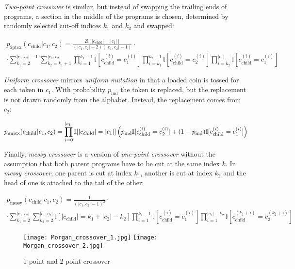 \emph{Two-point crossover} is similar, but instead of swapping the trailing ends of programs, a section in the middle of the programs is chosen, determined by randomly selected cut-off indices $k_1$ and $k_2$ and swapped:

\begin{multline}
    p_\text{2ptcx}(c_\text{child}|c_1,c_2) =
        \frac{2 \mathbb{I}[|c_\text{child}|=|c_1|]}{(|c_1,c_2|-2)(|c_1,c_2|-1)} 
        \cdot \\ \cdot
        \sum\limits_{k_1=2}^{|c_1,c_2|-1}
        \sum\limits_{k_2=k_1+1}^{|c_1,c_2|} 
        \prod\limits_{i=1}^{k_1-1} \mathbb{I}[c_\text{child}^{(i)} = c_1^{(i)}] \prod\limits_{i=k_1}^{k_2-1} \mathbb{I}[c_\text{child}^{(i)} = c_2^{(i)}]
        \prod\limits_{i=k_2}^{|c_1|} \mathbb{I}[c_\text{child}^{(i)} = c_1^{(i)}]
\end{multline}

\emph{Uniform crossover} mirrors \emph{uniform mutation} in that a loaded coin is tossed for each token in $c_1$. With probability $p_\text{ind}$ the token is replaced, but the replacement is not drawn randomly from the alphabet. Instead, the replacement comes from $c_2$:

\begin{equation}
    p_\text{unicx}(c_\text{child}|c_1,c_2) = \prod\limits_{i=0}^{|c_1|} \mathbb{I}[|c_\text{child}|=|c_1|] \\ \left(p_\text{ind} \mathbb{I}[c_\text{child}^{(i)} = c_2^{(i)}] + (1 - p_\text{ind}) \mathbb{I}[c_\text{child}^{(i)} = c_1^{(i)}] \right)
\end{equation}

Finally, \emph{messy crossover} is a version of \emph{one-point crossover} without the assumption that both parent programs have to be cut at the same index $k$.
In \emph{messy crossover}, one parent is cut at index $k_1$, another is cut at index $k_2$ and the head of one is attached to the tail of the other:

\begin{multline}
    p_\text{messy}(c_\text{child}|c_1,c_2) = \frac{1}{(|c_1,c_2|-1)^2} \cdot \\ \cdot \sum\limits_{k_1=2}^{|c_1,c_2|} \sum\limits_{k_2=2}^{|c_1,c_2|} \mathbb{I}[|c_\text{child}|=k_1+|c_2|-k_2] \prod\limits_{i=1}^{k_1-1} \mathbb{I}[c_\text{child}^{(i)} = c_1^{(i)}] \prod\limits_{i=1}^{|c_2|-k_2} \mathbb{I}[c_\text{child}^{(k_1+i)} = c_2^{(k_2+i)}]
\end{multline}

\begin{figure}
    \centering
    \texttt{[image: Morgan\_crossover\_1.jpg]}
    \texttt{[image: Morgan\_crossover\_2.jpg]}
    \caption{1-point and 2-point crossover \cite{evocritique}}
    \label{fig:crossover}
\end{figure}

